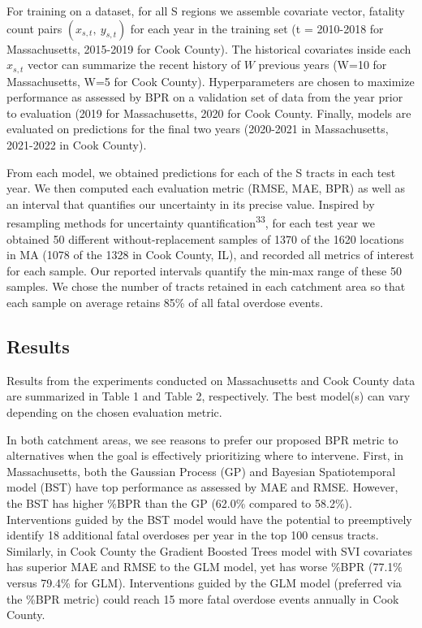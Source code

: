 For training on a dataset, for all S regions we assemble covariate vector, fatality count pairs \((x_{s,t},\ y_{s,t})\) for each year in the training set (t = 2010-2018 for Massachusetts, 2015-2019 for Cook County). The historical covariates inside each \(x_{s,t}\) vector can summarize the recent history of \(W\) previous years (W=10 for Massachusetts, W=5 for Cook County). Hyperparameters are chosen to maximize performance as assessed by BPR on a validation set of data from the year prior to evaluation (2019 for Massachusetts, 2020 for Cook County. Finally, models are evaluated on predictions for the final two years (2020-2021 in Massachusetts, 2021-2022 in Cook County).

From each model, we obtained predictions for each of the S tracts in each test year. We then computed each evaluation metric (RMSE, MAE, BPR) as well as an interval that quantifies our uncertainty in its precise value. Inspired by resampling methods for uncertainty quantification\textsuperscript{33}, for each test year we obtained 50 different without-replacement samples of 1370 of the 1620 locations in MA (1078 of the 1328 in Cook County, IL), and recorded all metrics of interest for each sample. Our reported intervals quantify the min-max range of these 50 samples. We chose the number of tracts retained in each catchment area so that each sample on average retains 85\% of all fatal overdose events.

\subsection{Results}\label{results}

Results from the experiments conducted on Massachusetts and Cook County data are summarized in Table 1 and Table 2, respectively. The best model(s) can vary depending on the chosen evaluation metric.

In both catchment areas, we see reasons to prefer our proposed BPR metric to alternatives when the goal is effectively prioritizing where to intervene. First, in Massachusetts, both the Gaussian Process (GP) and Bayesian Spatiotemporal model (BST) have top performance as assessed by MAE and RMSE. However, the BST has higher \%BPR than the GP (62.0\% compared to 58.2\%). Interventions guided by the BST model would have the potential to preemptively identify 18 additional fatal overdoses per year in the top 100 census tracts. Similarly, in Cook County the Gradient Boosted Trees model with SVI covariates has superior MAE and RMSE to the GLM model, yet has worse \%BPR (77.1\% versus 79.4\% for GLM). Interventions guided by the GLM model (preferred via the \%BPR metric) could reach 15 more fatal overdose events annually in Cook County.

